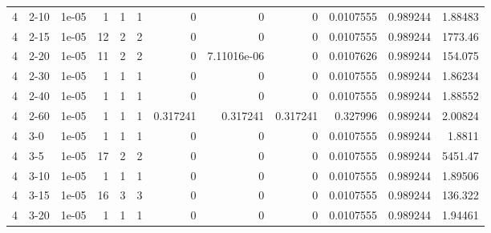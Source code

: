 \begin{tabular}{rlrrrrrrrrrr}
     4 & 2-10   &      1e-05 &           1 &                 1 &                 1 &     0           &     0           &      0           &        0.0107555 &               0.989244 &           1.88483  \\
     4 & 2-15   &      1e-05 &          12 &                 2 &                 2 &     0           &     0           &      0           &        0.0107555 &               0.989244 &        1773.46     \\
     4 & 2-20   &      1e-05 &          11 &                 2 &                 2 &     0           &     7.11016e-06 &      0           &        0.0107626 &               0.989244 &         154.075    \\
     4 & 2-30   &      1e-05 &           1 &                 1 &                 1 &     0           &     0           &      0           &        0.0107555 &               0.989244 &           1.86234  \\
     4 & 2-40   &      1e-05 &           1 &                 1 &                 1 &     0           &     0           &      0           &        0.0107555 &               0.989244 &           1.88552  \\
     4 & 2-60   &      1e-05 &           1 &                 1 &                 1 &     0.317241    &     0.317241    &      0.317241    &        0.327996  &               0.989244 &           2.00824  \\
     4 & 3-0    &      1e-05 &           1 &                 1 &                 1 &     0           &     0           &      0           &        0.0107555 &               0.989244 &           1.8811   \\
     4 & 3-5    &      1e-05 &          17 &                 2 &                 2 &     0           &     0           &      0           &        0.0107555 &               0.989244 &        5451.47     \\
     4 & 3-10   &      1e-05 &           1 &                 1 &                 1 &     0           &     0           &      0           &        0.0107555 &               0.989244 &           1.89506  \\
     4 & 3-15   &      1e-05 &          16 &                 3 &                 3 &     0           &     0           &      0           &        0.0107555 &               0.989244 &         136.322    \\
     4 & 3-20   &      1e-05 &           1 &                 1 &                 1 &     0           &     0           &      0           &        0.0107555 &               0.989244 &           1.94461  \\

\end{tabular}
